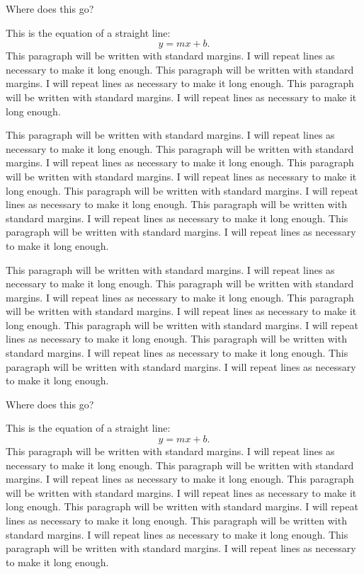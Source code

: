 \documentclass[numbib]{buthesis_p}  %
\begin{document}
Where does this go?

This is the equation of a straight line:
\begin{equation}
y = mx + b.
\end{equation}
This paragraph will be written with standard margins. I will repeat
lines as necessary to make it long enough. This paragraph will be
written with standard margins. I will repeat lines as necessary to
make it long enough. This paragraph will be written with standard
margins. I will repeat lines as necessary to make it long enough.


This paragraph will be written with standard margins. I will repeat
lines as necessary to make it long enough. This paragraph will be
written with standard margins. I will repeat lines as necessary to
make it long enough. This paragraph will be written with standard
margins. I will repeat lines as necessary to make it long enough.
This paragraph will be written with standard margins. I will repeat
lines as necessary to make it long enough. This paragraph will be
written with standard margins. I will repeat lines as necessary to
make it long enough. This paragraph will be written with standard
margins. I will repeat lines as necessary to make it long enough.


This paragraph will be written with standard margins. I will repeat
lines as necessary to make it long enough. This paragraph will be
written with standard margins. I will repeat lines as necessary to
make it long enough. This paragraph will be written with standard
margins. I will repeat lines as necessary to make it long enough. This
paragraph will be written with standard margins. I will repeat lines
as necessary to make it long enough. This paragraph will be written
with standard margins. I will repeat lines as necessary to make it
long enough. This paragraph will be written with standard margins. I
will repeat lines as necessary to make it long enough.

Where does this go?

This is the equation of a straight line:
\begin{equation}
y = mx + b.
\end{equation}
This paragraph will be written with standard margins. I will repeat
lines as necessary to make it long enough. This paragraph will be
written with standard margins. I will repeat lines as necessary to
make it long enough. This paragraph will be written with standard
margins. I will repeat lines as necessary to make it long enough.
This paragraph will be written with standard margins. I will repeat
lines as necessary to make it long enough. This paragraph will be
written with standard margins. I will repeat lines as necessary to
make it long enough. This paragraph will be written with standard
margins. I will repeat lines as necessary to make it long enough.
\end{document}
